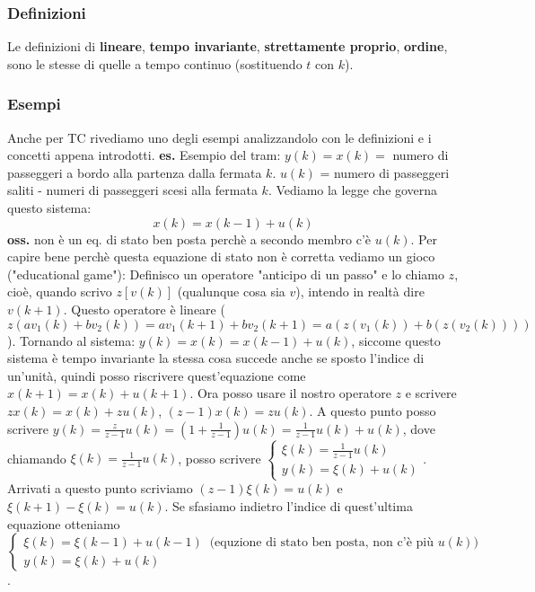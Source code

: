 \subsubsection{Definizioni}
Le definizioni di \textbf{lineare}, \textbf{tempo invariante}, \textbf{strettamente proprio}, \textbf{ordine}, sono le stesse di quelle a tempo continuo (sostituendo $t$ con $k$).
\subsubsection{Esempi}
Anche per TC rivediamo uno degli esempi analizzandolo con le definizioni e i concetti appena introdotti.\newline
\newline
\textbf{es.} Esempio del tram:\newline
$y(k) = x(k) =$ numero di passeggeri a bordo alla partenza dalla fermata $k$.\newline
$u(k)$ = numero di passeggeri saliti - numeri di passeggeri scesi alla fermata $k$.\newline
Vediamo la legge che governa questo sistema:
\[
        x(k) = x(k-1) + u(k)
\]
\textbf{oss.} non è un eq. di stato ben posta perchè a secondo membro c'è $u(k)$.\newline
Per capire bene perchè questa equazione di stato non è corretta vediamo un gioco ("educational game"):\newline
Definisco un operatore "anticipo di un passo" e lo chiamo $z$, cioè, quando scrivo $z[v(k)]$ (qualunque cosa sia $v$), intendo in realtà dire $v(k+1)$. Questo operatore è lineare ( $z (a v_1(k) + b v_2(k)) = a v_1(k+1) + b v_2(k+1) = a (z(v_1(k)) + b (z(v_2(k))))$ ).\newline
Tornando al sistema: $y(k) = x(k) = x(k-1) + u(k)$, siccome questo sistema è tempo invariante la stessa cosa succede anche se sposto l'indice di un'unità, quindi posso riscrivere quest'equazione come $x(k+1) = x(k) + u (k+1)$. Ora posso usare il nostro operatore $z$ e scrivere $zx(k) = x(k) + zu(k)$, $(z-1) x(k) = z u(k)$.\newline
A questo punto posso scrivere $y(k) = \frac{z}{z-1}u(k) = (1+ \frac{1}{z-1})u(k) = \frac{1}{z-1}u(k) + u(k)$, dove chiamando $\xi(k) = \frac{1}{z-1}u(k)$, posso scrivere $\begin{cases}
    \xi(k) = \frac{1}{z-1}u(k)\\
    y(k) = \xi(k) + u(k)
\end{cases}$. Arrivati a questo punto scriviamo $(z-1) \xi (k) = u(k)$ e $\xi(k+1) - \xi(k) = u(k)$. Se sfasiamo indietro l'indice di quest'ultima equazione otteniamo $\begin{cases}
    \xi (k) = \xi(k-1) + u(k-1) \;\; \text{(equzione di stato ben posta, non c'è più $u(k)$)}\;\\
    y(k) = \xi(k) + u(k)
\end{cases}$.\newline
